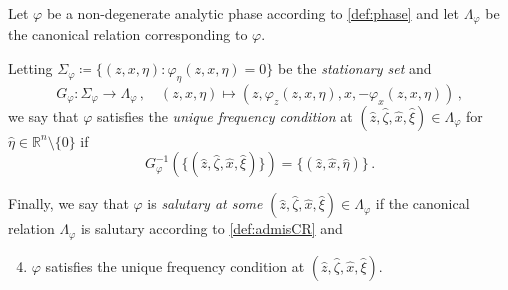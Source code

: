 \documentclass[
	fontsize=11pt, 
	twoside=false, 
	abstract=true, 
	a4paper,
]{scrartcl}
\newcommand{\sem}{\setminus\{0\}}
\newcommand{\RR}{\mathbb{R}}
\newcommand{\an}{\quad\text{and}\quad}
\begin{document}
\begin{definition}\label{def:bolkone}
	Let $\varphi$ be a non-degenerate analytic phase according to \cref{def:phase} and let $\Lambda_\varphi$ be the canonical relation corresponding to $\varphi$.

	Letting $\Sigma_\varphi \coloneqq \{(z,x,\eta) \colon \varphi_\eta(z,x,\eta)=0\}$ be the \emph{stationary set} and
	\[
		G_\varphi \colon \Sigma_\varphi\to \Lambda_\varphi\,,\quad (z,x,\eta)\mapsto (z,\varphi_z(z,x,\eta),x,-\varphi_x(z,x,\eta))\,,
	\]
	we say that $\varphi$ satisfies the \emph{unique frequency condition} at $(\hat z,\hat \zeta, \hat x, \hat \xi) \in \Lambda_\varphi$ for $\hat\eta\in\RR^n\sem$ if
	\begin{equation*}%
		G_\varphi^{-1}\left(\{(\hat z,\hat \zeta,\hat x,\hat \xi)\}\right) = \{(\hat z, \hat x, \hat \eta)\}\,.
	\end{equation*}

	Finally, we say that $\varphi$ is \emph{salutary at some} $(\hat z, \hat \zeta, \hat x,\hat \xi)\in\Lambda_\varphi$ if %
	the canonical relation $\Lambda_\varphi$ is salutary according to \cref{def:admisCR} and %
	\begin{enumerate}[label=$\mathrm{ph}$\arabic*.]\setcounter{enumi}{3}
		\item\label{as:n4} $\varphi$ satisfies the unique frequency condition at $(\hat z, \hat\zeta,\hat x, \hat \xi)$.
	\end{enumerate}
\end{definition}
\end{document}
